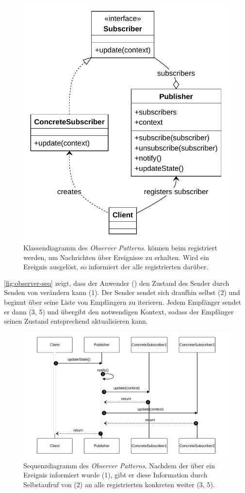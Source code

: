\begin{figure}[!ht]
	\centering
	\includegraphics[width=0.60\linewidth]{images/patterns/observer-class.pdf}
	\caption{Klassendiagramm des \emph{Observer Patterns}.  können beim  registriert werden, um Nachrichten über Ereignisse zu erhalten. Wird ein Ereignis ausgelöst, so informiert der  alle registrierten  darüber. \cite{skobeleva_observer_2023}}
	\label{fig:observer-class}
\end{figure}

\autoref{fig:observer-seq} zeigt, dass der Anwender () den Zustand des Sender durch Senden von  verändern kann (1). Der Sender sendet sich draufhin selbst  (2) und beginnt über seine Liste von Empfängern zu iterieren. Jedem Empfänger sendet er dann  (3, 5) und übergibt den notwendigen Kontext, sodass der Empfänger seinen Zustand entsprechend aktualisieren kann.

\begin{figure}[!ht]
	\centering
	\includegraphics[width=0.95\linewidth]{images/patterns/observer-seq.pdf}
	\caption{Sequenzdiagramm des \emph{Observer Patterns}. Nachdem der  über ein Ereignis informiert wurde (1), gibt er diese Information durch Selbstaufruf von  (2) an alle registrierten konkreten  weiter (3, 5). \cite{skobeleva_observer_2023}}
	\label{fig:observer-seq}
\end{figure}

